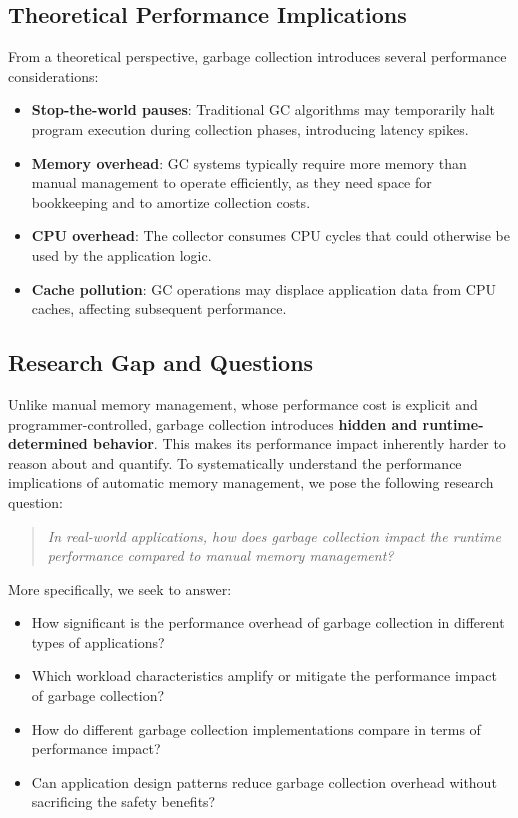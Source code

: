 \documentclass{article}
\begin{document}
\subsection{Theoretical Performance Implications}

From a theoretical perspective, garbage collection introduces several performance considerations:

\begin{itemize}
    \item \textbf{Stop-the-world pauses}: Traditional GC algorithms may temporarily halt program execution during collection phases, introducing latency spikes.
    \item \textbf{Memory overhead}: GC systems typically require more memory than manual management to operate efficiently, as they need space for bookkeeping and to amortize collection costs.
    \item \textbf{CPU overhead}: The collector consumes CPU cycles that could otherwise be used by the application logic.
    \item \textbf{Cache pollution}: GC operations may displace application data from CPU caches, affecting subsequent performance.
\end{itemize}

\subsection{Research Gap and Questions}

Unlike manual memory management, whose performance cost is explicit and programmer-controlled, garbage collection introduces \textbf{hidden and runtime-determined behavior}. This makes its performance impact inherently harder to reason about and quantify. To systematically understand the performance implications of automatic memory management, we pose the following research question:

\begin{quote}
    \emph{In real-world applications, how does garbage collection impact the runtime performance compared to manual memory management? }
\end{quote}

More specifically, we seek to answer:

\begin{itemize}
    \item How significant is the performance overhead of garbage collection in different types of applications? 
    \item Which workload characteristics amplify or mitigate the performance impact of garbage collection? 
    \item How do different garbage collection implementations compare in terms of performance impact? 
    \item Can application design patterns reduce garbage collection overhead without sacrificing the safety benefits? 
\end{itemize}
\end{document}
